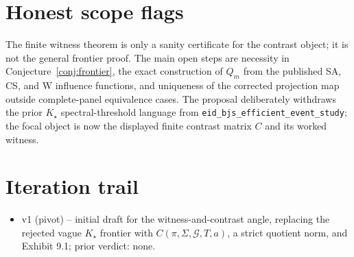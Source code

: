 \documentclass[11pt]{article}
\theoremstyle{definition}
\theoremstyle{plain}
\theoremstyle{remark}
\begin{document}
\section{Honest scope flags}
The finite witness theorem is only a sanity certificate for the contrast object; it is not the general frontier proof. The main open steps are necessity in Conjecture~\ref{conj:frontier}, the exact construction of \(Q_m\) from the published SA, CS, and W influence functions, and uniqueness of the corrected projection map outside complete-panel equivalence cases. The proposal deliberately withdraws the prior \(K_\star\) spectral-threshold language from \texttt{eid\_bjs\_efficient\_event\_study}; the focal object is now the displayed finite contrast matrix \(C\) and its worked witness.

\section{Iteration trail}
\begin{itemize}[leftmargin=*]
\item v1 (pivot) -- initial draft for the witness-and-contrast angle, replacing the rejected vague \(K_\star\) frontier with \(C(\pi,\Sigma,\mathcal G,T,a)\), a strict quotient norm, and Exhibit 9.1; prior verdict: none.
\end{itemize}
\end{document}
